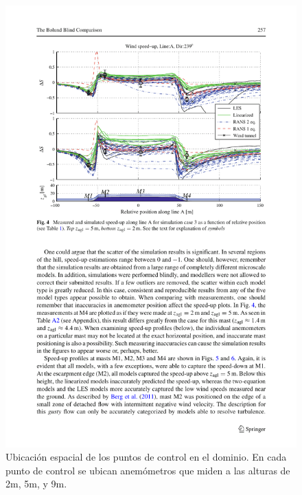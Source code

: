 \begin{figure}[H]
	\centering
	\includegraphics[width=0.9\linewidth,trim={1.7cm 12.3cm 0.9cm 2cm},clip]{bolund2.pdf}%
	\caption{Ubicación espacial de los puntos de control en el dominio. En cada punto de control se ubican anemómetros que miden a las alturas de 2m, 5m, y 9m.}
	\label{fig:an1_speedup}
\end{figure}

